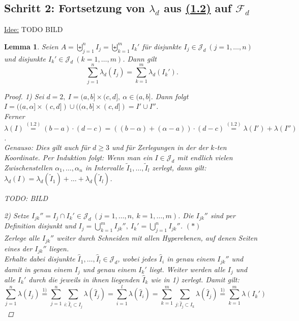 \documentclass[a4paper]{scrreprt}
\newcommand{\Fd}{\mathcal{F}_d}
\newcommand{\Jd}{\mathcal{J}_d}
\newcommand{\bigdcup}{\biguplus}
\newcommand{\jlabel}[1]{\label{j_#1}}
\newcommand{\jhyperref}[2]{\hyperref[j_#1]{#2}}
\newcommand{\jlink}[1]{\jhyperref{#1}{#1}}
\newcommand{\jspace}{\vspace{8pt}}
\theoremstyle{plain}
\newtheorem{lem}[thm]{Lemma}
\theoremstyle{definition}
\begin{document}
{{{\subsection*{Schritt 2: Fortsetzung von $\lambda_d$ aus \jlink{(1.2)} auf $\Fd$}

\uline{Idee:} TODO BILD

\begin{lem}
\jlabel{Lem 1.16}
    Seien $A = \bigdcup_{j=1}^n I_j = \bigdcup_{k=1}^m I_k'$ für disjunkte $I_j \in \Jd \ (j=1, \dots, n)$ und disjunkte $I_k' \in \Jd \ (k=1,\dots,m)$. Dann gilt
    \begin{displaymath}
        \sum_{j=1}^n \lambda_d(I_j) = \sum_{k=1}^m \lambda_d(I_k').
    \end{displaymath}
    \begin{proof}
        1) Sei $d=2, \ I = (a,b] \times (c,d], \ \alpha \in (a,b]$. Dann folgt $I=((a,\alpha] \times (c,d])\cup ((\alpha,b] \times (c,d]) = I' \cup I''$.\\
        Ferner $\lambda(I) \overset{\jlink{(1.2)}}{=} (b-a)\cdot (d-c) = ((b-\alpha) + (\alpha - a))\cdot (d-c) \overset{\jlink{(1.2)}}{=} \lambda(I') + \lambda(I'')$.\\
        Genauso: Dies gilt auch für $d \ge 3$ und für Zerlegungen in der der $k$-ten Koordinate. Per Induktion folgt: Wenn man ein $I \in \Jd$ mit endlich vielen Zwischenstellen $\alpha_1,\dots,\alpha_n$ in Intervalle $\tilde{I}_1,\dots, \tilde{I}_l$ zerlegt, dann gilt: $\lambda_d(I) = \lambda_d(\tilde{I}_1) + \dots + \lambda_d(\tilde{I}_l) $.
        
        \jspace
        
        TODO: BILD
        
        \jspace
        
        2) Setze $I_{jk}'' = I_j \cap I_k' \in \Jd \ (j=1,\dots,n, \ k=1,\dots,m)$. Die $I_{jk}''$ sind per Definition disjunkt und $I_j = \bigcup_{k=1}^m I_{jk}'',\ I_k' = \bigcup_{j=1}^n I_{jk}''$. $(*)$\\
        Zerlege alle $I_{jk}''$ weiter durch Schneiden mit allen Hyperebenen, auf denen Seiten eines der $I_{jk}''$ liegen.\\
        Erhalte dabei disjunkte $\hat{I}_1, \dots, \hat{I}_l \in \Jd$, wobei jedes $\hat{I}_i$ in genau einem $I_{jk}''$ und damit in genau einem $I_j$ und genau einem $I_k'$ liegt. Weiter werden alle $I_j$ und alle $I_k'$ durch die jeweils in ihnen liegenden $\hat{I}_k$ wie in 1) zerlegt. Damit gilt:
        \begin{displaymath}
            \sum_{j=1}^n \lambda(I_j) \overset{\text{1)}}{=} \sum_{j=1}^n \sum_{i: \hat{I}_i \subset I_j} \lambda(\hat{I}_j) = \sum_{i=1}^l \lambda(\hat{I}_i) = \sum_{k=1}^m \sum_{j: \hat{I}_j \subset I_k} \lambda(\hat{I}_j) \overset{1)}{=} \sum_{k=1}^m \lambda(I_k')
        \end{displaymath}
    \end{proof}
\end{lem}

}}}
\end{document}
